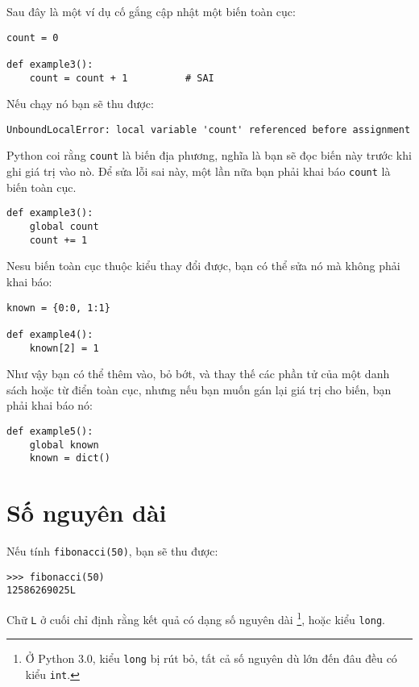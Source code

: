 \documentclass[11pt]{book}
\begin{document}

Sau đây là một ví dụ cố gắng cập nhật một biến toàn cục:

\beforeverb
\begin{verbatim}
count = 0

def example3():
    count = count + 1          # SAI
\end{verbatim}
\afterverb
%
Nếu chạy nó bạn sẽ thu được:


\beforeverb
\begin{verbatim}
UnboundLocalError: local variable 'count' referenced before assignment
\end{verbatim}
\afterverb
%
Python coi rằng {\tt count} là biến địa phương, nghĩa là bạn sẽ
đọc biến này trước khi ghi giá trị vào nò. Để sửa lỗi sai này, một lần nữa
bạn phải khai báo {\tt count} là biến toàn cục.


\beforeverb
\begin{verbatim}
def example3():
    global count
    count += 1
\end{verbatim}
\afterverb
%
Nesu biến toàn cục thuộc kiểu thay đổi được, bạn có thể sửa nó
mà không phải khai báo:


\beforeverb
\begin{verbatim}
known = {0:0, 1:1}

def example4():
    known[2] = 1
\end{verbatim}
\afterverb
%
Như vậy bạn có thể thêm vào, bỏ bớt, và thay thế các phần tử của
một danh sách hoặc từ điển toàn cục, nhưng nếu bạn muốn gán lại
giá trị cho biến, bạn phải khai báo nó:

\beforeverb
\begin{verbatim}
def example5():
    global known
    known = dict()
\end{verbatim}
\afterverb
%

\section{Số nguyên dài}


Nếu tính {\tt fibonacci(50)}, bạn sẽ thu được:

\beforeverb
\begin{verbatim}
>>> fibonacci(50)
12586269025L
\end{verbatim}
\afterverb
%
Chữ {\tt L} ở cuối chỉ định rằng kết quả có dạng số nguyên dài
\footnote{Ở Python 3.0, kiểu {\tt long} bị rút bỏ, tất cả số nguyên
  dù lớn đến đâu đều có kiểu {\tt int}.}, hoặc kiểu {\tt long}.
\end{document}
